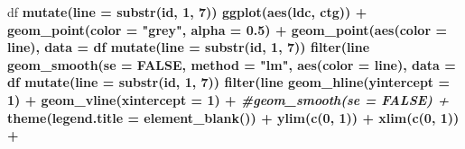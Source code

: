 \documentclass[
]{article}
\newenvironment{Shaded}{\begin{snugshade}}{\end{snugshade}}
\newcommand{\CommentTok}[1]{\textcolor[rgb]{0.56,0.35,0.01}{\textit{#1}}}
\newcommand{\DataTypeTok}[1]{\textcolor[rgb]{0.13,0.29,0.53}{#1}}
\newcommand{\DecValTok}[1]{\textcolor[rgb]{0.00,0.00,0.81}{#1}}
\newcommand{\FloatTok}[1]{\textcolor[rgb]{0.00,0.00,0.81}{#1}}
\newcommand{\KeywordTok}[1]{\textcolor[rgb]{0.13,0.29,0.53}{\textbf{#1}}}
\newcommand{\NormalTok}[1]{#1}
\newcommand{\OperatorTok}[1]{\textcolor[rgb]{0.81,0.36,0.00}{\textbf{#1}}}
\newcommand{\OtherTok}[1]{\textcolor[rgb]{0.56,0.35,0.01}{#1}}
\newcommand{\StringTok}[1]{\textcolor[rgb]{0.31,0.60,0.02}{#1}}
\begin{document}
\begin{Shaded}
\begin{Highlighting}[]
\NormalTok{df }\OperatorTok{%>%}
\StringTok{  }\KeywordTok{mutate}\NormalTok{(}\DataTypeTok{line =} \KeywordTok{substr}\NormalTok{(id, }\DecValTok{1}\NormalTok{, }\DecValTok{7}\NormalTok{)) }\OperatorTok{%>%}
\StringTok{  }\KeywordTok{ggplot}\NormalTok{(}\KeywordTok{aes}\NormalTok{(ldc, ctg)) }\OperatorTok{+}\StringTok{ }
\StringTok{  }\KeywordTok{geom_point}\NormalTok{(}\DataTypeTok{color =} \StringTok{"grey"}\NormalTok{, }\DataTypeTok{alpha =} \FloatTok{0.5}\NormalTok{) }\OperatorTok{+}\StringTok{ }
\StringTok{  }\KeywordTok{geom_point}\NormalTok{(}\KeywordTok{aes}\NormalTok{(}\DataTypeTok{color =}\NormalTok{ line), }\DataTypeTok{data =}\NormalTok{ df }\OperatorTok{%>%}\StringTok{ }
\StringTok{               }\KeywordTok{mutate}\NormalTok{(}\DataTypeTok{line =} \KeywordTok{substr}\NormalTok{(id, }\DecValTok{1}\NormalTok{, }\DecValTok{7}\NormalTok{)) }\OperatorTok{%>%}\StringTok{ }
\StringTok{               }\KeywordTok{filter}\NormalTok{(line }\OperatorTok{%in%}\StringTok{ }\KeywordTok{c}\NormalTok{(}\StringTok{"D007T01"}\NormalTok{, }\StringTok{"D018T01"}\NormalTok{, }\StringTok{"D019T01"}\NormalTok{))) }\OperatorTok{+}\StringTok{ }
\StringTok{  }\KeywordTok{geom_smooth}\NormalTok{(}\DataTypeTok{se =} \OtherTok{FALSE}\NormalTok{, }
              \DataTypeTok{method =} \StringTok{"lm"}\NormalTok{, }
              \KeywordTok{aes}\NormalTok{(}\DataTypeTok{color =}\NormalTok{ line), }\DataTypeTok{data =}\NormalTok{ df }\OperatorTok{%>%}\StringTok{ }
\StringTok{               }\KeywordTok{mutate}\NormalTok{(}\DataTypeTok{line =} \KeywordTok{substr}\NormalTok{(id, }\DecValTok{1}\NormalTok{, }\DecValTok{7}\NormalTok{)) }\OperatorTok{%>%}\StringTok{ }
\StringTok{               }\KeywordTok{filter}\NormalTok{(line }\OperatorTok{%in%}\StringTok{ }\KeywordTok{c}\NormalTok{(}\StringTok{"D007T01"}\NormalTok{, }\StringTok{"D018T01"}\NormalTok{, }\StringTok{"D019T01"}\NormalTok{))) }\OperatorTok{+}
\StringTok{  }\KeywordTok{geom_hline}\NormalTok{(}\DataTypeTok{yintercept =} \DecValTok{1}\NormalTok{) }\OperatorTok{+}\StringTok{ }
\StringTok{  }\KeywordTok{geom_vline}\NormalTok{(}\DataTypeTok{xintercept =} \DecValTok{1}\NormalTok{) }\OperatorTok{+}
\StringTok{  }\CommentTok{#geom_smooth(se = FALSE) +}
\StringTok{  }\KeywordTok{theme}\NormalTok{(}\DataTypeTok{legend.title =} \KeywordTok{element_blank}\NormalTok{()) }\OperatorTok{+}\StringTok{ }\KeywordTok{ylim}\NormalTok{(}\KeywordTok{c}\NormalTok{(}\DecValTok{0}\NormalTok{, }\DecValTok{1}\NormalTok{)) }\OperatorTok{+}\StringTok{ }\KeywordTok{xlim}\NormalTok{(}\KeywordTok{c}\NormalTok{(}\DecValTok{0}\NormalTok{, }\DecValTok{1}\NormalTok{)) }\OperatorTok{+}
}}}}}}}}
\end{Highlighting}
\end{Shaded}
\end{document}
